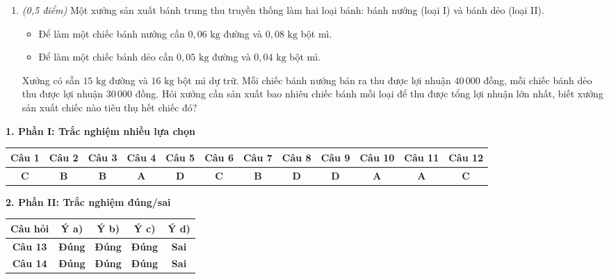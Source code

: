 \documentclass[12pt,a4paper]{article}
\newcommand{\parttitle}[1]{\par\vspace{2pt}{\large\bfseries\color{ink}#1}\par\vspace{1pt}}
\begin{document}
\begin{enumerate}[resume]
\item \textit{(0,5 điểm)} Một xưởng sản xuất bánh trung thu truyền thống làm hai loại bánh: bánh nướng (loại I) và bánh dẻo (loại II).
\begin{itemize}[leftmargin=0.5cm]
    \item Để làm một chiếc bánh nướng cần $0{,}06\text{ kg}$ đường và $0{,}08\text{ kg}$ bột mì.
    \item Để làm một chiếc bánh dẻo cần $0{,}05\text{ kg}$ đường và $0{,}04\text{ kg}$ bột mì.
\end{itemize}
Xưởng có sẵn $15\text{ kg}$ đường và $16\text{ kg}$ bột mì dự trữ. Mỗi chiếc bánh nướng bán ra thu được lợi nhuận $40\,000$ đồng, mỗi chiếc bánh dẻo thu được lợi nhuận $30\,000$ đồng. Hỏi xưởng cần sản xuất bao nhiêu chiếc bánh mỗi loại để thu được tổng lợi nhuận lớn nhất, biết xưởng sản xuất chiếc nào tiêu thụ hết chiếc đó?
\end{enumerate}

\newpage
\parttitle{BẢNG ĐÁP ÁN TỔNG HỢP}

\vspace{0.2cm}
\textbf{1. Phần I: Trắc nghiệm nhiều lựa chọn}
\begin{center}
{\setlength{\tabcolsep}{2.5pt}\small
\begin{tabular}{|c|c|c|c|c|c|c|c|c|c|c|c|}
\hline
\textbf{Câu 1} & \textbf{Câu 2} & \textbf{Câu 3} & \textbf{Câu 4} & \textbf{Câu 5} & \textbf{Câu 6} & \textbf{Câu 7} & \textbf{Câu 8} & \textbf{Câu 9} & \textbf{Câu 10} & \textbf{Câu 11} & \textbf{Câu 12} \\
\hline
\textbf{C} & \textbf{B} & \textbf{B} & \textbf{A} & \textbf{D} & \textbf{C} & \textbf{B} & \textbf{D} & \textbf{D} & \textbf{A} & \textbf{A} & \textbf{C} \\
\hline
\end{tabular}}
\end{center}

\vspace{0.2cm}
\textbf{2. Phần II: Trắc nghiệm đúng/sai}
\begin{center}
\begin{tabular}{|c|c|c|c|c|}
\hline
\textbf{Câu hỏi} & \textbf{Ý a)} & \textbf{Ý b)} & \textbf{Ý c)} & \textbf{Ý d)} \\
\hline
\textbf{Câu 13} & \textbf{Đúng} & \textbf{Đúng} & \textbf{Đúng} & \textbf{Sai} \\
\hline
\textbf{Câu 14} & \textbf{Đúng} & \textbf{Đúng} & \textbf{Đúng} & \textbf{Sai} \\
\hline
\end{tabular}
\end{center}
\end{document}
